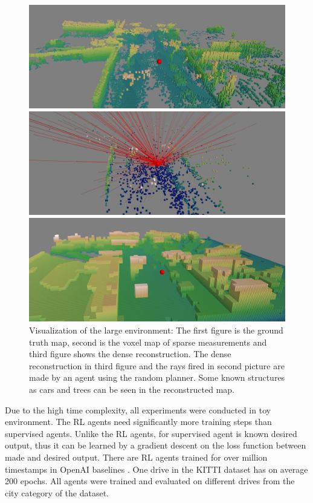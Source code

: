 \begin{figure}[h!]
\centering
\includegraphics[width=0.8\linewidth]{fig/gt.png}

\vspace{1mm}

\includegraphics[width=0.8\linewidth]{fig/sparse.png}

\vspace{1mm}

\includegraphics[width=0.8\linewidth]{fig/reconstructed.png}

\caption[Environment visualization]{Visualization of the large environment: The first figure is the ground truth map, second is the voxel map of sparse measurements and third figure shows the dense reconstruction. The dense reconstruction in third figure and the rays fired in second picture are made by an agent using the random planner. Some known structures as cars and trees can be seen in the reconstructed map.}
\label{fig:visualization}
\end{figure}
\renewcommand{\thefootnote}{\fnsymbol{footnote}}

\clearpage
Due to the high time complexity, all experiments were conducted in toy environment. The RL agents need significantly more training steps than supervised agents. Unlike the RL agents, for supervised agent is known desired output, thus it can be learned by a gradient descent on the loss function between made and desired output. There are RL agents trained for over million timestamps in OpenAI baselines \cite{openai2017}. One drive in the KITTI dataset has on average 200 epochs. All agents were trained and evaluated on different drives from the city category of the dataset.

